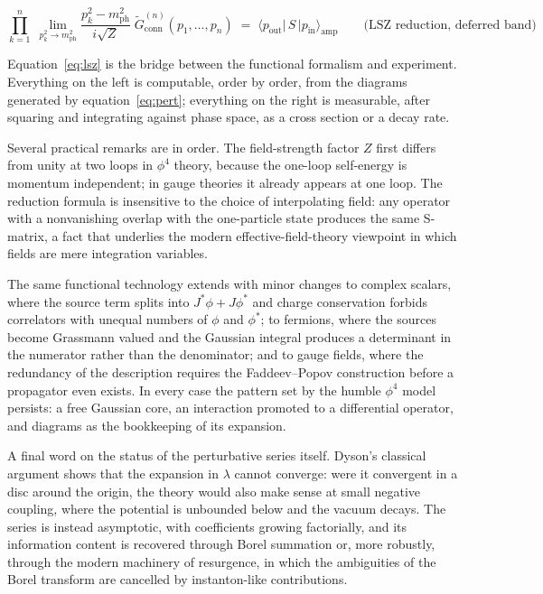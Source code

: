 \documentclass[twocolumn]{article}
\begin{document}
\begin{wideband}
\begin{equation}
  \prod_{k=1}^{n}\;\lim_{p_k^2\to m_{\mathrm{ph}}^2}
  \frac{p_k^2 - m_{\mathrm{ph}}^2}{i\sqrt{Z}}\;
  \tilde G^{(n)}_{\mathrm{conn}}(p_1,\dots,p_n)
  \;=\;
  \langle p_{\mathrm{out}}|\,S\,|p_{\mathrm{in}}\rangle_{\mathrm{amp}}
  \qquad\text{(LSZ reduction, deferred band)}
  \label{eq:lsz}
\end{equation}
\end{wideband}

Equation~\eqref{eq:lsz} is the bridge between the functional formalism
and experiment. Everything on the left is computable, order by order,
from the diagrams generated by equation~\eqref{eq:pert}; everything on
the right is measurable, after squaring and integrating against phase
space, as a cross section or a decay rate.

Several practical remarks are in order. The field-strength factor $Z$
first differs from unity at two loops in $\phi^4$ theory, because the
one-loop self-energy is momentum independent; in gauge theories it
already appears at one loop. The reduction formula is insensitive to the
choice of interpolating field: any operator with a nonvanishing overlap
with the one-particle state produces the same S-matrix, a fact that
underlies the modern effective-field-theory viewpoint in which fields
are mere integration variables.

The same functional technology extends with minor changes to
complex scalars, where the source term splits into $J^*\phi +
J\phi^*$ and charge conservation forbids correlators with unequal
numbers of $\phi$ and $\phi^*$; to fermions, where the sources become
Grassmann valued and the Gaussian integral produces a determinant in the
numerator rather than the denominator; and to gauge fields, where the
redundancy of the description requires the Faddeev--Popov construction
before a propagator even exists. In every case the
pattern set by the humble $\phi^4$ model persists: a free
Gaussian core, an interaction promoted to a differential operator, and
diagrams as the bookkeeping of its expansion.

A final word on the status of the perturbative series itself. Dyson's
classical argument shows that the expansion in $\lambda$ cannot
converge: were it convergent in a disc around the origin, the theory
would also make sense at small negative coupling, where the potential is
unbounded below and the vacuum decays. The series is instead asymptotic,
with coefficients growing factorially, and its information content is
recovered through Borel summation or, more robustly, through the modern
machinery of resurgence, in which the ambiguities of the Borel transform
are cancelled by instanton-like contributions.
\end{document}
